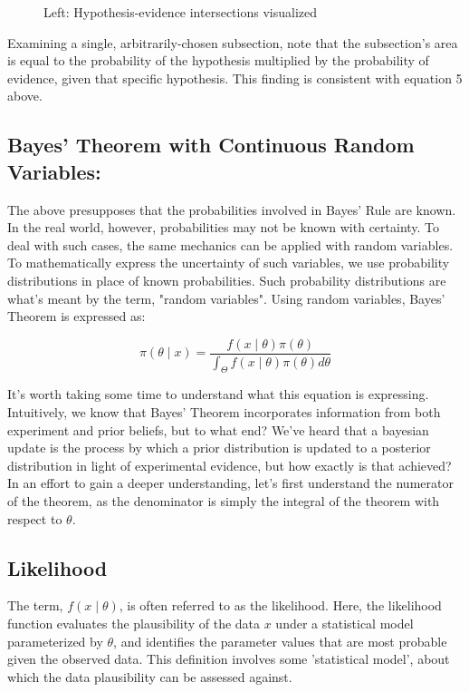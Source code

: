 \documentclass[12pt]{article}
\begin{document}
\begin{figure}[h!]
\begin{minipage}{0.28\textwidth}
    \end{minipage}
    \caption{Left: Hypothesis-evidence intersections visualized}
    \label{fig:both_visuals}
\end{figure}

\noindent Examining a single, arbitrarily-chosen subsection, note that the subsection's area is equal to the probability of the hypothesis multiplied by the probability of evidence, given that specific hypothesis. This finding is consistent with equation 5 above.

\newpage

\subsection*{Bayes' Theorem with Continuous Random Variables:}
\noindent The above presupposes that the probabilities involved in Bayes' Rule are known. In the real world, however, probabilities may not be known with certainty. To deal with such cases, the same mechanics can be applied with random variables. To mathematically express the uncertainty of such variables, we use probability distributions in place of known probabilities. Such probability distributions are what's meant by the term, "random variables". Using random variables, Bayes' Theorem is expressed as:

\begin{equation}
\pi(\theta \mid x) = \frac{f(x \mid \theta) \pi(\theta)}{\int_{\Theta} f(x \mid \theta) \pi(\theta) d\theta}
\end{equation}

\noindent It's worth taking some time to understand what this equation is expressing. Intuitively, we know that Bayes' Theorem incorporates information from both experiment and prior beliefs, but to what end? We've heard that a bayesian update is the process by which a prior distribution is updated to a posterior distribution in light of experimental evidence, but how exactly is that achieved? In an effort to gain a deeper understanding, let's first understand the numerator of the theorem, as the denominator is simply the integral of the theorem with respect to $\theta$. \\

\subsection*{Likelihood}
\noindent The term, $f(x\mid\theta)$, is often referred to as the likelihood. Here, the likelihood function evaluates the plausibility of the data $x$ under a statistical model parameterized by $\theta$, and identifies the parameter values that are most probable given the observed data. This definition involves some 'statistical model', about which the data plausibility can be assessed against.
\end{document}
